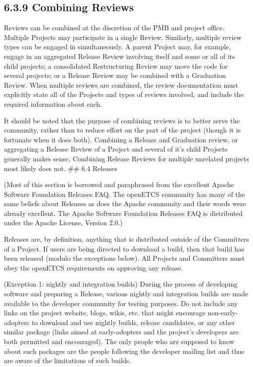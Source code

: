 \subsection{6.3.9 Combining Reviews}\label{combining-reviews}

Reviews can be combined at the discretion of the PMB and project office.
Multiple Projects may participate in a single Review. Similarly,
multiple review types can be engaged in simultaneously. A parent Project
may, for example, engage in an aggregated Release Review involving
itself and some or all of its child projects; a consolidated
Restructuring Review may move the code for several projects; or a
Release Review may be combined with a Graduation Review. When multiple
reviews are combined, the review documentation must explicitly state all
of the Projects and types of reviews involved, and include the required
information about each.

It should be noted that the purpose of combining reviews is to better
serve the community, rather than to reduce effort on the part of the
project (though it is fortunate when it does both). Combining a Release
and Graduation review, or aggregating a Release Review of a Project and
several of it's child Projects generally makes sense. Combining Release
Reviews for multiple unrelated projects most likely does not. \#\# 6.4
Releases

(Most of this section is borrowed and paraphrased from the excellent
Apache Software Foundation Releases FAQ. The openETCS community has many
of the same beliefs about Releases as does the Apache community and
their words were already excellent. The Apache Software Foundation
Releases FAQ is distributed under the Apache License, Version 2.0.)

Releases are, by definition, anything that is distributed outside of the
Committers of a Project. If users are being directed to download a
build, then that build has been released (modulo the exceptions below).
All Projects and Committers must obey the openETCS requirements on
approving any release.

(Exception 1: nightly and integration builds) During the process of
developing software and preparing a Release, various nightly and
integration builds are made available to the developer community for
testing purposes. Do not include any links on the project website,
blogs, wikis, etc. that might encourage non-early-adopters to download
and use nightly builds, release candidates, or any other similar package
(links aimed at early-adopters and the project's developers are both
permitted and encouraged). The only people who are supposed to know
about such packages are the people following the developer mailing list
and thus are aware of the limitations of such builds.

